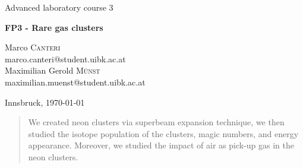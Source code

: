 \documentclass[a4paper,10pt]{article}
\begin{document}
\begin{titlepage}
 \begin{center}
	\Large{Advanced laboratory course 3}
	\end{center}
	\begin{center}
	 \LARGE{\textbf{FP3 - Rare gas clusters}}
	\end{center}

	\begin{center}

	\large Marco \textsc{Canteri} \\
	marco.canteri@student.uibk.ac.at\\
	\large Maximilian Gerold \textsc{Münst} \\
	maximilian.muenst@student.uibk.ac.at
	\end{center}

	\begin{center}
	\vspace{1cm}
	Innsbruck, \today
	\vspace{1cm}
	\end{center}

	\begin{abstract}
	We created neon clusters via superbeam expansion technique, we then studied the isotope population of the clusters, magic numbers, and energy appearance. Moreover, we studied the 
	impact of air as pick-up gas in the neon clusters.
    \end{abstract}
    \vspace{1cm}


\end{titlepage}
\end{document}
